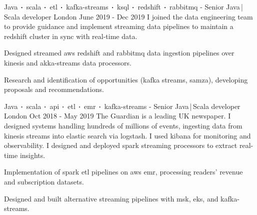 \begin{cventries}
    \cventry
    {Java$\sqbig$scala$\sqbig$etl$\sqbig$kafka-streams$\sqbig$ksql$\sqbig$redshift$\sqbig$rabbitmq}
    { - Senior Java\,|\,Scala developer}
    {London}
    {June 2019 - Dec 2019}
    {I joined the data engineering team to provide guidance and implement streaming data pipelines to maintain a redshift cluster in sync with real-time data.}
    {
        \begin{cvitems}
            \item{Designed streamed aws redshift and rabbitmq data ingestion pipelines over kinesis and akka-streams data processors. }
            \item{Research and identification of opportunities (kafka streams, samza), developing proposals and recommendations.}
        \end{cvitems}
    }

    \cventry
    {Java$\sqbig$scala$\sqbig$api$\sqbig$etl$\sqbig$emr$\sqbig$kafka-streams}
    { - Senior Java\,|\,Scala developer}
    {London}
    {Oct 2018 - May 2019}
    {The Guardian is a leading UK newspaper. I designed systems handling hundreds of millions of events, ingesting data from kinesis streams into elastic search via logstash. I used kibana for monitoring and observability. I designed and deployed spark streaming processors to extract real-time insights.}
    {
        \begin{cvitems}
            \item{Implementation of spark etl pipelines on aws emr, processing readers' revenue and subscription datasets.}
            \item{Designed and built alternative streaming pipelines with msk, eks, and kafka-streams.}
        \end{cvitems}
    }


\end{cventries}
